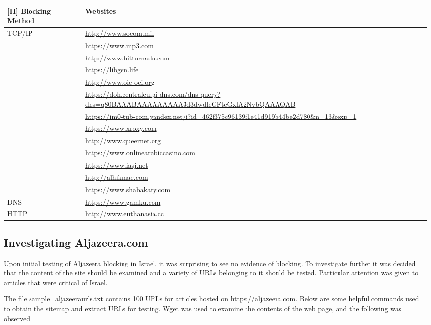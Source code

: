 \begin{tabular}{ll} [H]
\toprule
\textbf{Blocking Method} & \textbf{Websites} \\
\midrule
TCP/IP & \url{http://www.socom.mil} \\
       & \url{https://www.mp3.com} \\
       & \url{http://www.bittornado.com} \\
       & \url{https://libgen.life} \\
       & \url{http://www.oic-oci.org} \\
       & \url{https://doh.centraleu.pi-dns.com/dns-query?dns=q80BAAABAAAAAAAAA3d3dwdleGFtcGxlA2NvbQAAAQAB} \\
       & \url{https://im0-tub-com.yandex.net/i?id=462f375c96139f1e41d919b44be2d780\&n=13\&exp=1} \\
       & \url{https://www.xroxy.com} \\
       & \url{http://www.queernet.org} \\
       & \url{https://www.onlinearabiccasino.com} \\
       & \url{https://www.iasj.net} \\
       & \url{http://alhikmae.com} \\
       & \url{https://www.shabakaty.com} \\
\midrule
DNS    & \url{https://www.gamku.com} \\
\midrule
HTTP   & \url{http://www.euthanasia.cc} \\
\bottomrule
\end{tabular}



\subsection{Investigating Aljazeera.com}
Upon initial testing of Aljazeera blocking in Israel, it was surprising to see no evidence of blocking. To investigate further it was decided that the content of the site should be examined and a variety of URLs belonging to it should be tested. Particular attention was given to articles that were critical of Israel.

The file sample\_aljazeeraurls.txt contains 100 URLs for articles hosted on https://aljazeera.com. Below are some helpful commands used to obtain the sitemap and extract URLs for testing. Wget was used to examine the contents of the web page, and the following was observed.

